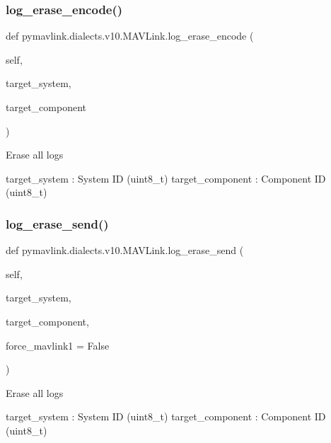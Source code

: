 \begin{DoxyVerb}
\begin{DoxyVerb}
\begin{DoxyVerb}
\begin{DoxyVerb}
\subsubsection{\texorpdfstring{log\+\_\+erase\+\_\+encode()}{log\_erase\_encode()}}
{\footnotesize\ttfamily def pymavlink.\+dialects.\+v10.\+M\+A\+V\+Link.\+log\+\_\+erase\+\_\+encode (\begin{DoxyParamCaption}\item[{}]{self,  }\item[{}]{target\+\_\+system,  }\item[{}]{target\+\_\+component }\end{DoxyParamCaption})}

\begin{DoxyVerb}Erase all logs

target_system             : System ID (uint8_t)
target_component          : Component ID (uint8_t)\end{DoxyVerb}
 \mbox{\label{classpymavlink_1_1dialects_1_1v10_1_1MAVLink_a490ae561c069e23a64a2b53cd5ad55c0}} 
\subsubsection{\texorpdfstring{log\+\_\+erase\+\_\+send()}{log\_erase\_send()}}
{\footnotesize\ttfamily def pymavlink.\+dialects.\+v10.\+M\+A\+V\+Link.\+log\+\_\+erase\+\_\+send (\begin{DoxyParamCaption}\item[{}]{self,  }\item[{}]{target\+\_\+system,  }\item[{}]{target\+\_\+component,  }\item[{}]{force\+\_\+mavlink1 = {\ttfamily False} }\end{DoxyParamCaption})}

\begin{DoxyVerb}Erase all logs

target_system             : System ID (uint8_t)
target_component          : Component ID (uint8_t)\end{DoxyVerb}
 \mbox{\label{classpymavlink_1_1dialects_1_1v10_1_1MAVLink_a6c1a49dcd47f45f14d361d7850b1980f}} 

\end{DoxyVerb}
\end{DoxyVerb}
\end{DoxyVerb}
\end{DoxyVerb}
